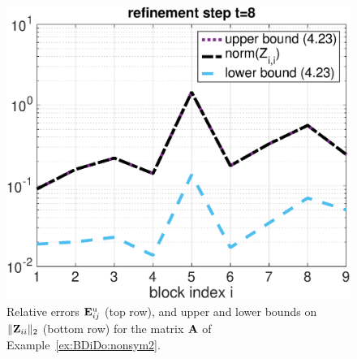 \begin{example}
{\begin{figure}[h!]
\begin{minipage}[t]{0.48\linewidth}
\includegraphics[width=0.99\linewidth]{figures/9times9_Z3_Bounds_t8.eps}
\end{minipage}
\caption{Relative errors $\mathbf{E}^{\text{u}}_{ij}$ (top row), and upper and lower bounds on $\|\mathbf{Z}_{ii}\|_2$ (bottom row) for the matrix $\mathbf{A}$ of Example~\ref{ex:BDiDo:nonsym2}.}
\label{fig:BDiDo:ex:nonsym2}
\end{figure}
}\end{example}

\newpage

